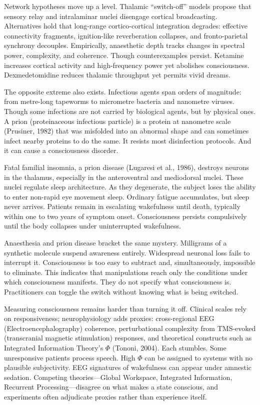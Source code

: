 Network hypotheses move up a level. Thalamic ``switch-off'' models propose that sensory relay and intralaminar nuclei disengage cortical broadcasting. Alternatives hold that long-range cortico-cortical integration degrades: effective connectivity fragments, ignition-like reverberation collapses, and fronto-parietal synchrony decouples. Empirically, anaesthetic depth tracks changes in spectral power, complexity, and coherence. Though counterexamples persist. Ketamine increases cortical activity and high-frequency power yet abolishes consciousness. Dexmedetomidine reduces thalamic throughput yet permits vivid dreams.

The opposite extreme also exists. Infectious agents span orders of magnitude: from metre-long tapeworms to micrometre bacteria and nanometre viruses. Though some infections are not carried by biological agents, but by physical ones. A prion (proteinaceous infectious particle) is a protein at nanometre scale (Prusiner, 1982) that was misfolded into an abnormal shape and can sometimes infect nearby proteins to do the same. It resists most disinfection protocols. And it can cause a consciousness disorder.

Fatal familial insomnia, a prion disease (Lugaresi et al., 1986), destroys neurons in the thalamus, especially in the anteroventral and mediodorsal nuclei. These nuclei regulate sleep architecture. As they degenerate, the subject loses the ability to enter non-rapid eye movement sleep. Ordinary fatigue accumulates, but sleep never arrives. Patients remain in escalating wakefulness until death, typically within one to two years of symptom onset. Consciousness persists compulsively until the body collapses under uninterrupted wakefulness.

Anaesthesia and prion disease bracket the same mystery. Milligrams of a synthetic molecule suspend awareness entirely. Widespread neuronal loss fails to interrupt it. Consciousness is too easy to subtract and, simultaneously, impossible to eliminate. This indicates that manipulations reach only the conditions under which consciousness manifests. They do not specify what consciousness is. Practitioners can toggle the switch without knowing what is being switched.

Measuring consciousness remains harder than turning it off. Clinical scales rely on responsiveness; neurophysiology adds proxies: cross-regional EEG (Electroencephalography) coherence, perturbational complexity from TMS-evoked (transcranial magnetic stimulation) responses, and theoretical constructs such as Integrated Information Theory's $\Phi$ (Tononi, 2004). Each stumbles. Some unresponsive patients process speech. High $\Phi$ can be assigned to systems with no plausible subjectivity. EEG signatures of wakefulness can appear under amnestic sedation. Competing theories—Global Workspace, Integrated Information, Recurrent Processing—disagree on what makes a state conscious, and experiments often adjudicate proxies rather than experience itself.

